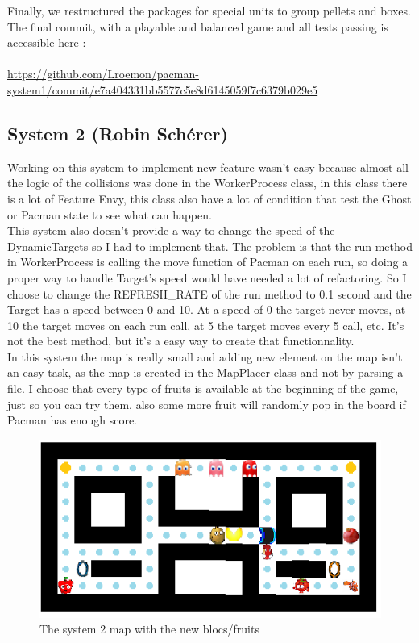 \documentclass[]{article}
\begin{document}
\vspace{0.4cm}

Finally, we restructured the packages for special units to group pellets and boxes. The final commit, with a playable and balanced game and all tests passing is accessible here :\\~\\
\url{https://github.com/Lroemon/pacman-system1/commit/e7a404331bb5577c5e8d6145059f7c6379b029e5}

\newpage
\subsection{System 2 (Robin Schérer)}

\indent\par Working on this system to implement new feature wasn't easy because almost all the logic of the collisions was done in the WorkerProcess class, in this class there is a lot of Feature Envy, this class also have a lot of condition that test the Ghost or Pacman state to see what can happen. \\

This system also doesn't provide a way to change the speed of the DynamicTargets so I had to implement that. The problem is that the run method in WorkerProcess is calling the move function of Pacman on each run, so doing a proper way to handle Target's speed would have needed a lot of refactoring. So I choose to change the REFRESH\_RATE of the run method to 0.1 second and the Target has a speed between 0 and 10. At a speed of 0 the target never moves, at 10 the target moves on each run call, at 5 the target moves every 5 call, etc. It's not the best method, but it's a easy way to create that functionnality.  \\

In this system the map is really small and adding new element on the map isn't an easy task, as the map is created in the MapPlacer class and not by parsing a file. I choose that every type of fruits is available at the beginning of the game, just so you can try them, also some more fruit will randomly pop in the board if Pacman has enough score. \\

\begin{figure}[h!]
\centering
\includegraphics[width=0.75\linewidth]{map.png}
\caption{The system 2 map with the new blocs/fruits}
\label{fig:map}
\end{figure}
\end{document}
